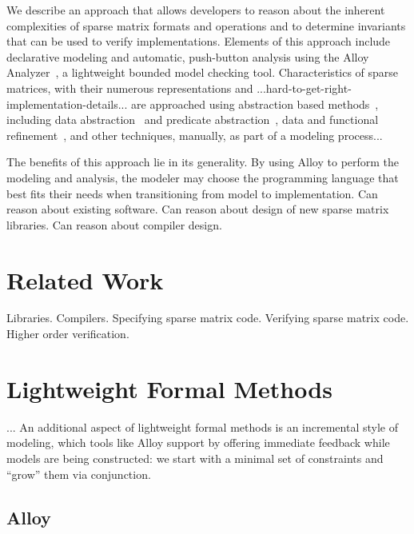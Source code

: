 \documentclass[11pt,conference]{IEEEtran}
\begin{document}
We describe an approach that allows developers to reason about the inherent complexities of sparse matrix formats and operations and to determine invariants that can be used to verify implementations.
Elements of this approach include declarative modeling and automatic, push-button analysis using the Alloy Analyzer~\cite{jackson2012}, a lightweight bounded model checking tool.  Characteristics of sparse matrices, with their numerous representations and ...hard-to-get-right-implementation-details... are approached using abstraction based methods~\cite{clarke1994}, including data abstraction~\cite{dingel1995} and predicate abstraction~\cite{graf1997}, data and functional refinement~\cite{woodcock1996}, and other techniques, manually, as part of a modeling process...

The benefits of this approach lie in its generality.  By using Alloy to perform the modeling and analysis, the modeler may choose the programming language that best fits their needs when transitioning from model to implementation.
Can reason about existing software.
Can reason about design of new sparse matrix libraries.
Can reason about compiler design.

\section{Related Work}

Libraries.
Compilers.
Specifying sparse matrix code.
Verifying sparse matrix code.
Higher order verification.

\section{Lightweight Formal Methods}

...
An additional aspect of lightweight formal methods is an incremental style of modeling, which tools like Alloy support by offering immediate feedback while models are being constructed: we start with a minimal set of constraints and ``grow'' them via conjunction.

\subsection{Alloy}
\end{document}
